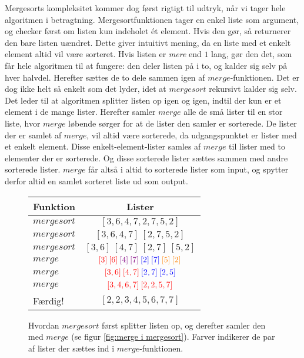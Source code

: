 Mergesorts kompleksitet kommer dog først rigtigt til udtryk, når vi tager hele algoritmen i betragtning. Mergesortfunktionen tager en enkel liste som argument, og checker først om listen kun indeholet ét element. Hvis den gør, så returnerer den bare listen uændret. Dette giver intuitivt mening, da en liste med et enkelt element altid vil være sorteret. Hvis listen er \emph{mere} end $1$ lang, gør den det, som får hele algoritmen til at fungere: den deler listen på i to, og kalder sig selv på hver halvdel. Herefter sættes de to dele sammen igen af $merge$-funktionen. Det er dog ikke helt så enkelt som det lyder, idet at $mergesort$ rekursivt kalder sig selv. Det leder til at algoritmen splitter listen op igen og igen, indtil der kun er et element i de mange lister. Herefter samler $merge$ alle de små lister til en stor liste, hvor $merge$ løbende sørger for at de lister den samler er sorterede. De lister der er samlet af $merge$, vil altid være sorterede, da udgangspunktet er lister med et enkelt element. Disse enkelt-element-lister samles af $merge$ til lister med to elementer der er sorterede. Og disse sorterede lister sættes sammen med andre sorterede lister. $merge$ får altså i altid to sorterede lister som input, og spytter derfor altid en samlet sorteret liste ud som output.


\begin{figure}
	\begin{center}
		\padtable
		\begin{tabular}{l|c}
			Funktion & Lister\\
			\hline
			$mergesort$ & $[3,6,4,7,2,7,5,2]$\\
			$mergesort$ & $[3,6,4,7]\: [2,7,5,2]$\\
			$mergesort$ & $[3,6] \: [4,7] \: [2,7] \: [5,2]$\\
			$merge$ & $\color{red}[3] \: [6]\color{black} \: \color{violet}[4] \: [7]\color{black} \: \color{blue}[2] \: [7]\color{black} \: \color{orange}[5] \: [2]\color{black}$\\
			$merge$ & $\color{red}[3,6] \: [4,7]\color{black} \: \color{blue}[2,7] \: [2,5]\color{black}$\\
			$merge$ & $\color{red}[3,4,6,7] \: [2,2,5,7]\color{black}$\\
			Færdig! & $[2,2,3,4,5,6,7,7]$\\
		\end{tabular}
	\end{center}
	\caption{Hvordan $mergesort$ først splitter listen op, og derefter samler den med $merge$ (se figur \ref{fig:merge i mergesort}). Farver indikerer de par af lister der sættes ind i $merge$-funktionen.}
	\label{fig:mergesort splitter op og sætter sammen}
\end{figure}



